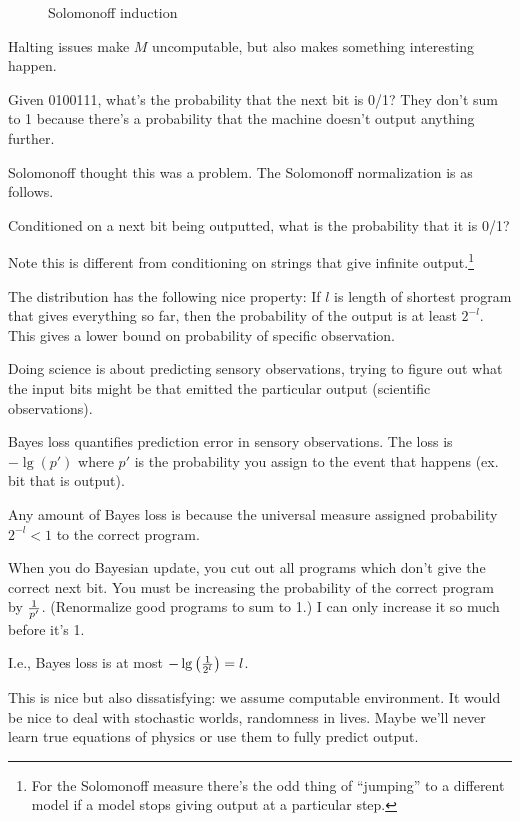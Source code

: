 \documentclass[11pt]{article}
\begin{document}
\begin{figure}
\caption{Solomonoff induction}
\end{figure}

Halting issues make $M$ uncomputable, but also makes something interesting happen.

Given 0100111, what's the probability that the next bit is 0/1? They don't sum to 1 because there's a probability that the machine doesn't output anything further.

Solomonoff thought this was a problem. The Solomonoff normalization is as follows.
\begin{df}
Conditioned on a next bit being outputted, what is the probability that it is 0/1?
\end{df}
Note this is different from conditioning on strings that give infinite output.\footnote{For the Solomonoff measure there's the odd thing of ``jumping'' to a different model if a model stops giving output at a particular step.}

The distribution has the following nice property: If $l$ is length of shortest program that gives everything so far, then the probability of the output is at least $2^{-l}$. This gives a lower bound on probability of specific observation.


Doing science is about predicting sensory observations, trying to figure out what the input bits might be that emitted the particular output (scientific observations).

Bayes loss quantifies prediction error in sensory  observations. %
The loss is $-\lg (p')$ where $p'$ is the probability you assign to the event that happens (ex. bit that is output).

Any amount of Bayes loss is because the universal measure assigned probability $2^{-l}<1$ to the correct program.

When you do Bayesian update, you cut out all programs which don't give the correct next bit. You must be increasing the probability of the correct program by $\frac{1}{p'}$. (Renormalize good programs to sum to 1.) I can only increase it so much before it's 1.

I.e., Bayes loss is at most $-\lg\left( {\frac{1}{2^l}} \right)=l$.

This is nice but also dissatisfying: we assume computable environment. It would be nice to deal with stochastic worlds, randomness in lives. 
Maybe we'll never learn true equations of physics or use them to fully predict output.
\end{document}
